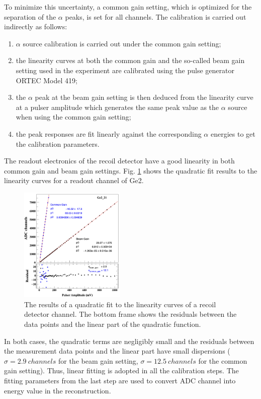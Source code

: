 \documentclass[number,5p]{elsarticle}
\begin{document}
To minimize this uncertainty, a common gain setting, which is optimized for the separation of the \(\alpha\) peaks, is set for all channels.
The calibration is carried out indirectly as follows:
\begin{enumerate}
\item \(\alpha\) source calibration is carried out under the common gain setting;
\item the linearity curves at both the common gain and the so-called beam gain
  setting used in the experiment are calibrated using the pulse generator ORTEC Model 419;
\item the $\alpha$ peak at the beam gain setting is then deduced
  from the linearity curve at a pulser amplitude which generates the same peak
  value as the $\alpha$ source when using the common gain setting;
\item the peak responses are fit linearly against the corresponding $\alpha$ energies
  to get the calibration parameters.
\end{enumerate}
The readout electronics of the recoil detector have a good linearity in both common gain and beam gain settings.
Fig. \ref{fig:electronic_linearity} shows the quadratic fit results to the linearity curves for a readout channel of Ge2.
\begin{figure}[b!]
  \centering
  \includegraphics[width=0.45\textwidth]{./linearity_quadratic_residual.png}
  \caption{The results of a quadratic fit to the linearity curves of a recoil
    detector channel. The bottom frame shows the residuals between the data
    points and the linear part of the quadratic function.}
  \label{fig:electronic_linearity}
\end{figure}
In both cases, the quadratic terms are negligibly small and the residuals
between the measurement data points and the linear part have small dispersions
($\sigma=\SI{2.9}{channels}$ for the beam gain setting, $\sigma=\SI{12.5}{channels}$ for the common gain setting).
Thus, linear fitting is adopted in all the calibration steps.
The fitting parameters from the last step are used to convert ADC channel into
energy value in the reconstruction.
\end{document}
